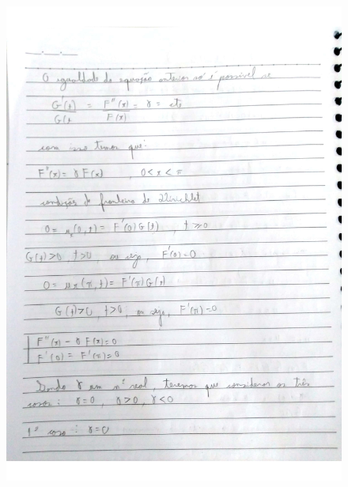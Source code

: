 \documentclass[a4paper]{article}
\begin{document}
                \begin{figure}{\textwidth}
            \centering
            \includegraphics[width=\textwidth]{Questoes-1-3_page-0002.jpg}
        \end{figure}
\end{document}

